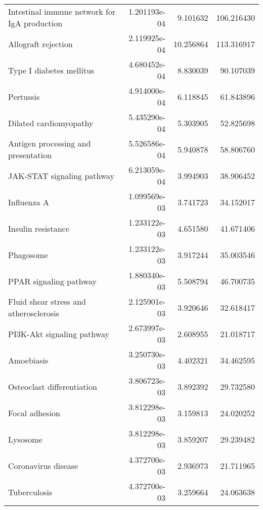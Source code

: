 \begin{tabular}{lrrr}
      Intestinal immune network for IgA production &      1.201193e-04 &  9.101632 &      106.216430 \\
                               Allograft rejection &      2.119925e-04 & 10.256864 &      113.316917 \\
                          Type I diabetes mellitus &      4.680452e-04 &  8.830039 &       90.107039 \\
                                         Pertussis &      4.914000e-04 &  6.118845 &       61.843896 \\
                            Dilated cardiomyopathy &      5.435290e-04 &  5.303905 &       52.825698 \\
               Antigen processing and presentation &      5.526586e-04 &  5.940878 &       58.806760 \\
                        JAK-STAT signaling pathway &      6.213059e-04 &  3.994903 &       38.906452 \\
                                       Influenza A &      1.099569e-03 &  3.741723 &       34.152017 \\
                                Insulin resistance &      1.233122e-03 &  4.651580 &       41.671406 \\
                                         Phagosome &      1.233122e-03 &  3.917244 &       35.003546 \\
                            PPAR signaling pathway &      1.880340e-03 &  5.508794 &       46.700735 \\
            Fluid shear stress and atherosclerosis &      2.125901e-03 &  3.920646 &       32.618417 \\
                        PI3K-Akt signaling pathway &      2.673997e-03 &  2.608955 &       21.018717 \\
                                        Amoebiasis &      3.250730e-03 &  4.402321 &       34.462595 \\
                        Osteoclast differentiation &      3.806723e-03 &  3.892392 &       29.732580 \\
                                    Focal adhesion &      3.812298e-03 &  3.159813 &       24.020252 \\
                                          Lysosome &      3.812298e-03 &  3.859207 &       29.239482 \\
                               Coronavirus disease &      4.372700e-03 &  2.936973 &       21.711965 \\
                                      Tuberculosis &      4.372700e-03 &  3.259664 &       24.063638 \\

\end{tabular}
